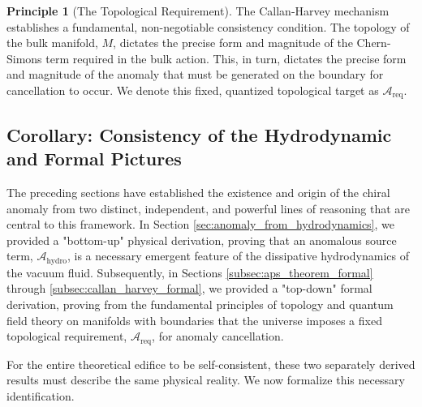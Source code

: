 \documentclass[11pt, letterpaper]{report}
\theoremstyle{plain} %
\theoremstyle{definition} %
\newtheorem{principle}{Principle}[chapter]
\theoremstyle{remark} %
\newcommand{\BulkM}{M}
\begin{document}
\begin{principle}[The Topological Requirement]
The Callan-Harvey mechanism establishes a fundamental, non-negotiable consistency condition. The topology of the bulk manifold, $\BulkM$, dictates the precise form and magnitude of the Chern-Simons term required in the bulk action. This, in turn, dictates the precise form and magnitude of the anomaly that must be generated on the boundary for cancellation to occur. We denote this fixed, quantized topological target as $\mathcal{A}_{\text{req}}$.
\end{principle}


\subsection{Corollary: Consistency of the Hydrodynamic and Formal Pictures}
\label{subsec:consistency_hydro_formal}

The preceding sections have established the existence and origin of the chiral anomaly from two distinct, independent, and powerful lines of reasoning that are central to this framework. In Section \ref{sec:anomaly_from_hydrodynamics}, we provided a "bottom-up" physical derivation, proving that an anomalous source term, $\mathcal{A}_{\text{hydro}}$, is a necessary emergent feature of the dissipative hydrodynamics of the vacuum fluid. Subsequently, in Sections \ref{subsec:aps_theorem_formal} through \ref{subsec:callan_harvey_formal}, we provided a "top-down" formal derivation, proving from the fundamental principles of topology and quantum field theory on manifolds with boundaries that the universe imposes a fixed topological requirement, $\mathcal{A}_{\text{req}}$, for anomaly cancellation.

For the entire theoretical edifice to be self-consistent, these two separately derived results must describe the same physical reality. We now formalize this necessary identification.
\end{document}
